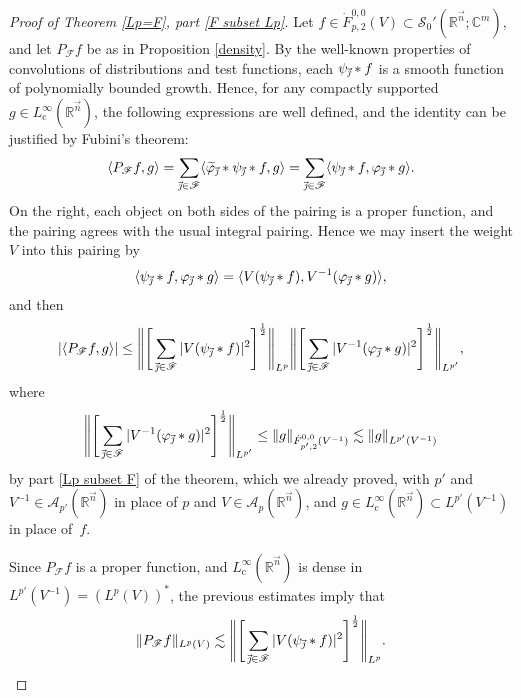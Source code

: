 \documentclass[11pt, reqno]{amsart}
\theoremstyle{definition}
\theoremstyle{remark}
\numberwithin{equation}{section}
\newcommand{\A}{\mathscr A}
\newcommand{\C}{\mathbb C}
\newcommand{\Fs}{\mathscr F}
\newcommand{\R}{\mathbb R}
\newcommand{\Sc}{\mathscr S}
\newcommand{\vj}{\vec{\textit{\j}}}
\newcommand{\vn}{\vec n}
\newcommand{\pair}[2]{\langle #1, #2 \rangle}
\newcommand{\abs}[1]{|#1|}
\newcommand{\Norm}[2]{\|#1\|_{#2}}
\begin{document}
\begin{proof}[Proof of Theorem \ref{Lp=F}, part \eqref{F subset Lp}]
Let $f\in\dot F^{0,0}_{p,2}(V) \subset \Sc_0'(\R^{\vn};\C^m)$, and let $P_{\Fs} f$ be as in Proposition \ref{density}.
By the well-known properties of convolutions of distributions and test functions, each $\psi_{\vj}*f$ is a smooth function of polynomially bounded growth. Hence, for any compactly supported $g\in L^\infty_{\mathrm c}(\R^{\vn})$, the following expressions are well defined, and the identity can be justified by Fubini's theorem:
\begin{equation*}
\pair{P_{\Fs} f}{g}=\sum_{\vj\in\Fs}\pair{\widetilde\varphi_{\vj}*\psi_{\vj}*f}{g}
=\sum_{\vj\in\Fs}\pair{\psi_{\vj}*f}{\varphi_{\vj}*g}.
\end{equation*}
On the right, each object on both sides of the pairing is a proper function, and the pairing agrees with the usual integral pairing. Hence we may insert the weight $V$ into this pairing by
\begin{equation*}
\pair{\psi_{\vj}*f}{\varphi_{\vj}*g}
=\pair{V(\psi_{\vj}*f) }{ V^{-1}(\varphi_{\vj}*g)},
\end{equation*}
and then
\begin{equation*}
\abs{ \pair{P_{\Fs} f}{g} }
\leq \Bigg\| \Bigg[ \sum_{\vj\in\Fs} \abs{V(\psi_{\vj}*f)}^2 \Bigg]^{\frac{1}{2}} \Bigg\|_{L^p}
\Bigg\|\Bigg[ \sum_{\vj\in\Fs}\abs{V^{-1}(\varphi_{\vj}*g)}^2 \Bigg]^{\frac12}\Bigg\|_{L^{p'}},
\end{equation*}
where
\begin{equation*}
\Bigg\|\Bigg[ \sum_{\vj\in\Fs}\abs{V^{-1}(\varphi_{\vj}*g)}^2 \Bigg]^{\frac12}\Bigg\|_{L^{p'}}
\leq \Norm{g}{ \dot F^{0,0}_{p',2} ( V^{-1} )  }
\lesssim \Norm{g}{ L^{p'}( V^{-1})}
\end{equation*}
by part \eqref{Lp subset F} of the theorem, which we already proved, with $p'$ and $V^{-1}\in\A_{p'}(\R^{\vn})$ in place of $p$ and $V\in\A_p(\R^{\vn})$, and $g\in L^\infty_{\mathrm c}(\R^{\vn})\subset L^{p'}(V^{-1})$ in place of~$f$.

Since $P_{\Fs} f$ is a proper function, and $L^\infty_{\mathrm c}(\R^{\vn})$ is dense in $L^{p'}(V^{-1})=(L^p(V))^*$, the previous estimates imply that
\begin{equation}\label{PFf<}
\Norm{P_{\Fs} f}{L^p(V)}
\lesssim \Bigg\| \Bigg[ \sum_{\vj\in\Fs} \abs{V(\psi_{\vj}*f)}^2 \Bigg]^{\frac{1}{2}} \Bigg\|_{L^p}.
\end{equation}


\end{proof}
\end{document}
